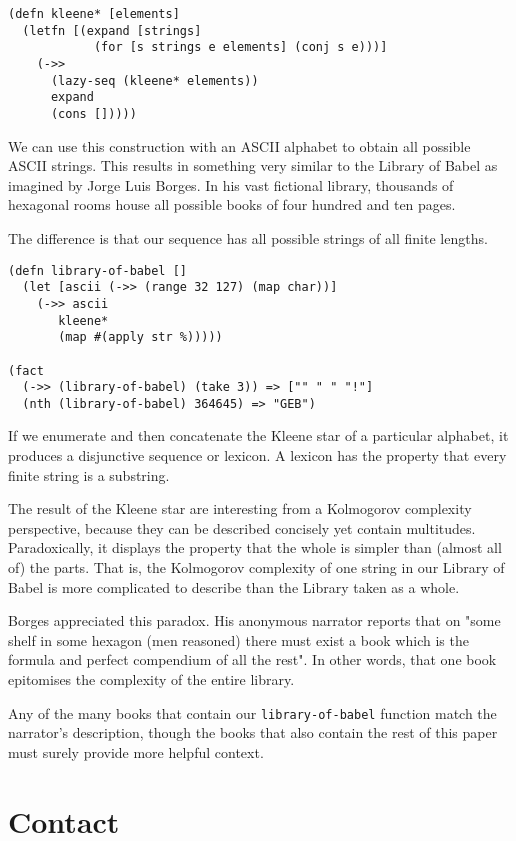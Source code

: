 \documentclass[numbers]{sigplanconf}
\begin{document}
\begin{verbatim}
(defn kleene* [elements]
  (letfn [(expand [strings]
            (for [s strings e elements] (conj s e)))]
    (->>
      (lazy-seq (kleene* elements))
      expand
      (cons []))))
\end{verbatim}

We can use this construction with an ASCII alphabet to obtain all possible ASCII strings.
This results in something very similar to the Library of Babel as imagined by Jorge Luis Borges\cite{The Library of Babel}. In his
vast fictional library, thousands of hexagonal rooms house all possible books of four hundred and ten pages.

The difference is that our sequence has all possible strings of all finite lengths.

\begin{verbatim}
(defn library-of-babel []
  (let [ascii (->> (range 32 127) (map char))]
    (->> ascii
       kleene*
       (map #(apply str %)))))

(fact
  (->> (library-of-babel) (take 3)) => ["" " " "!"]
  (nth (library-of-babel) 364645) => "GEB")
\end{verbatim}

If we enumerate and then concatenate the Kleene star of a particular alphabet, it produces
a disjunctive sequence or lexicon. A lexicon has the property that every finite string is a substring.

The result of the Kleene star are interesting from a Kolmogorov complexity perspective, because they can be described
concisely yet contain multitudes. Paradoxically, it displays the property that the whole is simpler than (almost all of)
the parts. That is, the Kolmogorov complexity of one string in our Library of Babel is more complicated to describe
than the Library taken as a whole.

Borges appreciated this paradox. His anonymous narrator reports that on "some shelf in some hexagon (men reasoned)
there must exist a book which is the formula and perfect compendium of all the rest". In other words, that one book
epitomises the complexity of the entire library.

Any of the many books that contain our \verb|library-of-babel| function match the narrator's description,
though the books that also contain the rest of this paper must surely provide more helpful context.

\section{Contact}
\end{document}
